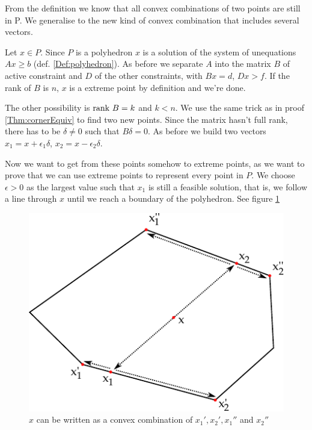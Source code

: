 \begin{pr}
From the definition we know that all convex combinations of two points are still in P. We generalise to the new kind of convex combination that includes several vectors.

Let $x\in P$. Since $P$ is a polyhedron $x$ is a solution of the system of unequations $Ax\geq b$ (def. \ref{Def:polyhedron}). As before we separate $A$ into the matrix $B$ of active constraint and $D$ of the other constraints, with $Bx=d$, $Dx>f$. If the rank of $B$ is $n$, $x$ is a extreme point by definition and we're done. 

The other possibility is $\mbox{rank } B=k$ and $k<n$. We use the same trick as in proof \ref{Thm:cornerEquiv} to find two new points. Since the matrix hasn't full rank, there has to be $\delta \neq 0$ such that $B\delta = 0$. As before we build two vectors $x_1 = x+ \epsilon_1 \delta$, $x_2=x-\epsilon_2 \delta$. 

Now we want to get from these points somehow to extreme points, as we want to prove that we can use extreme points to represent every point in $P$. We choose $\epsilon>0$ as the largest value such that $x_1$ is still a feasible solution, that is, we follow a line through $x$ until we reach a boundary of the polyhedron. See figure \ref{Fig:convCombExPoints}

\begin{figure}[hbt]
\begin{center}
\includegraphics{./images/convex_comb_extr_points.pdf}
\end{center}
\caption{$x$ can be written as a convex combination of $x_1',x_2', x_1''$ and $x_2''$}
\label{Fig:convCombExPoints}
\end{figure}


\end{pr}

